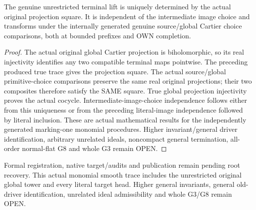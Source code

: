 \begin{theorem}
\label{hir:submersion-global-trace-unique-choice-cocycle}
\leanok
{}

The genuine unrestricted terminal lift is uniquely determined by the actual original projection square. It is independent of the intermediate image choice and transforms under the internally generated genuine source/global Cartier choice comparisons, both at bounded prefixes and OWN completion.
\end{theorem}
\begin{proof}
The actual original global Cartier projection is biholomorphic, so its real injectivity identifies any two compatible terminal maps pointwise. The preceding produced true trace gives the projection square. The actual source/global primitive-choice comparisons preserve the same real original projections; their two composites therefore satisfy the SAME square. True global projection injectivity proves the actual cocycle. Intermediate-image-choice independence follows either from this uniqueness or from the preceding literal-image independence followed by literal inclusion. These are actual mathematical results for the independently generated marking-one monomial procedures. Higher invariant/general driver identification, arbitrary unrelated ideals, noncompact general termination, all-order normal-flat G8 and whole G3 remain OPEN.
\end{proof}


Formal registration, native target/audits and publication remain pending root recovery. This actual monomial smooth trace includes the unrestricted original global tower and every literal target head. Higher general invariants, general old-driver identification, unrelated ideal admissibility and whole G3/G8 remain OPEN.
